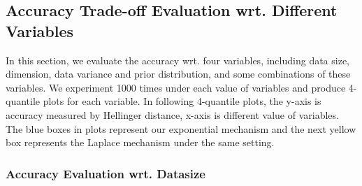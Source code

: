 \documentclass[sigconf, anonymous]{acmart}
\begin{document}




\subsection{Accuracy Trade-off Evaluation wrt. Different Variables}
\label{subsec_vs_variables}

In this section, we evaluate the accuracy wrt. four variables, including data size, dimension, data variance and prior distribution, and some combinations of these variables. We experiment 1000 times under each value of variables and produce 4-quantile plots for each variable. In following 4-quantile plots, the y-axis is accuracy measured by Hellinger distance, x-axis is different value of variables. The blue boxes in plots represent our exponential mechanism and the next yellow box represents the Laplace mechanism under the same setting.

\subsubsection{Accuracy Evaluation wrt. Datasize}
\label{subsubsec_vs_datasize}
\end{document}
